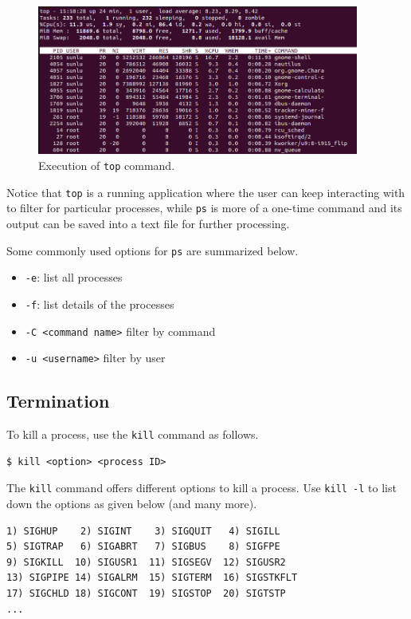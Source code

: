 \begin{figure}[!htb]
	\centering
	\includegraphics[width=300pt]{chapters/part-1/figures/topcommand.png}
	\caption{Execution of \texttt{top} command.} \label{ch:pm:fig:topcommand}
\end{figure}

Notice that \verb|top| is a running application where the user can keep interacting with to filter for particular processes, while \verb|ps| is more of a one-time command and its output can be saved into a text file for further processing.

Some commonly used options for \verb|ps| are summarized below.
\begin{itemize}
	\item \verb|-e|: list all processes
	\item \verb|-f|: list details of the processes
	\item \verb|-C <command name>| filter by command
	\item \verb|-u <username>| filter by user
\end{itemize}

\subsection{Termination}

To kill a process, use the \verb|kill| command as follows.
\begin{lstlisting}
$ kill <option> <process ID>
\end{lstlisting}

The \verb|kill| command offers different options to kill a process. Use \verb|kill -l| to list down the options as given below (and many more).
\begin{lstlisting}
1) SIGHUP    2) SIGINT    3) SIGQUIT   4) SIGILL
5) SIGTRAP   6) SIGABRT   7) SIGBUS    8) SIGFPE
9) SIGKILL  10) SIGUSR1  11) SIGSEGV  12) SIGUSR2
13) SIGPIPE 14) SIGALRM	 15) SIGTERM  16) SIGSTKFLT
17) SIGCHLD 18) SIGCONT	 19) SIGSTOP  20) SIGTSTP
...
\end{lstlisting}

